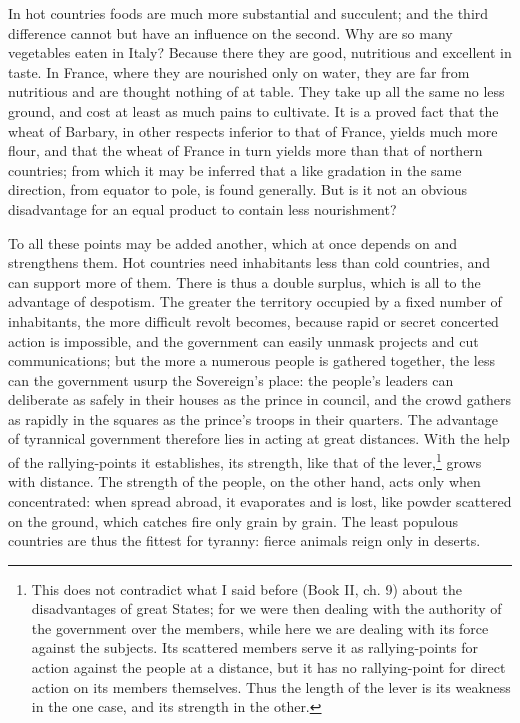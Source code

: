 \documentclass[12pt]{report}
\begin{document}
In hot countries foods are much more substantial and succulent; and the third difference cannot but have an influence on the second. Why are so many vegetables eaten in Italy? Because there they are good, nutritious and excellent in taste. In France, where they are nourished only on water, they are far from nutritious and are thought nothing of at table. They take up all the same no less ground, and cost at least as much pains to cultivate. It is a proved fact that the wheat of Barbary, in other respects inferior to that of France, yields much more flour, and that the wheat of France in turn yields more than that of northern countries; from which it may be inferred that a like gradation in the same direction, from equator to pole, is found generally. But is it not an obvious disadvantage for an equal product to contain less nourishment?

To all these points may be added another, which at once depends on and strengthens them. Hot countries need inhabitants less than cold countries, and can support more of them. There is thus a double surplus, which is all to the advantage of despotism. The greater the territory occupied by a fixed number of inhabitants, the more difficult revolt becomes, because rapid or secret concerted action is impossible, and the government can easily unmask projects and cut communications; but the more a numerous people is gathered together, the less can the government usurp the Sovereign's place: the people's leaders can deliberate as safely in their houses as the prince in council, and the crowd gathers as rapidly in the squares as the prince's troops in their quarters. The advantage of tyrannical government therefore lies in acting at great distances. With the help of the rallying-points it establishes, its strength, like that of the lever,\footnote{This does not contradict what I said before (Book II, ch. 9) about the disadvantages of great States; for we were then dealing with the authority of the government over the members, while here we are dealing with its force against the subjects. Its scattered members serve it as rallying-points for action against the people at a distance, but it has no rallying-point for direct action on its members themselves. Thus the length of the lever is its weakness in the one case, and its strength in the other.} grows with distance. The strength of the people, on the other hand, acts only when concentrated: when spread abroad, it evaporates and is lost, like powder scattered on the ground, which catches fire only grain by grain. The least populous countries are thus the fittest for tyranny: fierce animals reign only in deserts.
\end{document}
